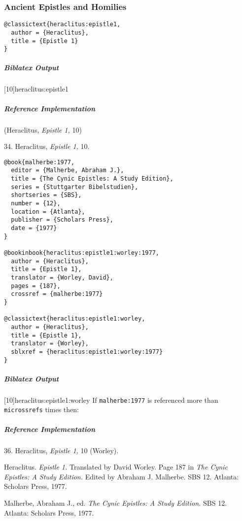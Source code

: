 \documentclass[a4paper]{article}
\newenvironment{biboutput}{%
  \subparagraph{Biblatex Output}
}{\color{black}}
\newenvironment{refimp}{%
  \subparagraph{Reference Implementation}
  \color{reference-colour}
  \rm
}{\par\color{black}}
\begin{document}
\subsubsection{Ancient Epistles and Homilies}

\begin{lstlisting}
@classictext{heraclitus:epistle1,
  author = {Heraclitus},
  title = {Epistle 1}
}
\end{lstlisting}

\begin{biboutput}
  [10]{heraclitus:epistle1}
\end{biboutput}

\begin{refimp}
  (Heraclitus, \emph{Epistle 1,} 10)

  34. Heraclitus, \emph{Epistle 1,} 10.
\end{refimp}

\begin{lstlisting}
@book{malherbe:1977,
  editor = {Malherbe, Abraham J.},
  title = {The Cynic Epistles: A Study Edition},
  series = {Stuttgarter Bibelstudien},
  shortseries = {SBS},
  number = {12},
  location = {Atlanta},
  publisher = {Scholars Press},
  date = {1977}
}

@bookinbook{heraclitus:epistle1:worley:1977,
  author = {Heraclitus},
  title = {Epistle 1},
  translator = {Worley, David},
  pages = {187},
  crossref = {malherbe:1977}
}

@classictext{heraclitus:epistle1:worley,
  author = {Heraclitus},
  title = {Epistle 1},
  translator = {Worley},
  sblxref = {heraclitus:epistle1:worley:1977}
}
\end{lstlisting}

\begin{biboutput}
  [10]{heraclitus:epistle1:worley}
  If \texttt{malherbe:1977} is referenced more than \texttt{microssrefs} times
  then:\par
\end{biboutput}

\begin{refimp}
  36. Heraclitus, \emph{Epistle 1,} 10 (Worley).

  \hangindent\bibindent Heraclitus. \emph{Epistle 1.} Translated by David
  Worley. Page 187 in \emph{The Cynic Epistles: A Study Edition.} Edited by
  Abraham J. Malherbe. SBS 12. Atlanta: Scholars Press, 1977.

  \hangindent\bibindent Malherbe, Abraham J., ed. \emph{The Cynic Epistles: A
  Study Edition.} SBS 12. Atlanta: Scholars Press, 1977.

\end{refimp}
\end{document}
